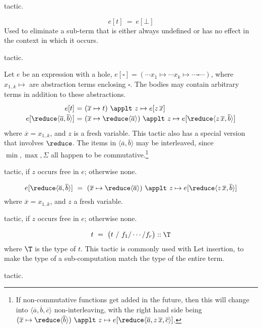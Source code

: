 \Obligations tactic.

\[e[t] ~=~ e[\bot]\]
%
Used to eliminate a sub-term that is either always undefined or has no effect
in the context in which it occurs.

\Obligations tactic.

\vspace{3mm}
Let $e$ be an expression with a hole, $e[\square] = (\cdots x_1 \mapsto \cdots x_k\mapsto \cdots \square \cdots)$, 
where $x_{1..k}\mapsto$ are abstraction terms enclosing $\square$. The bodies may contain arbitrary terms
in addition to these abstractions.
%
\[\renewcommand\arraystretch{1.2}
  \begin{array}{@{}r@{}c@{}l@{}}
  e[t] & ~=~ & (\overline{x}\mapsto t) ~\applt~ z\mapsto e[z\,\overline{x}] \\
  e[\reduce \langle\overline{a},\overline{b}\rangle] & ~=~ &
     (\overline{x}\mapsto \reduce\langle\overline{a}\rangle) ~\applt~ z\mapsto e[\reduce\langle z\,\overline{x}, \overline{b}\rangle]
  \end{array}\]
%
where $\overline{x}=x_{1..k}$, and $z$ is a fresh variable.
This tactic also has a special version that involves $\reduce$.
The items in $\langle \overline{a},\overline{b}\rangle$ may be interleaved, since
$\min,\max,\Sigma$ all happen to be commutative.\footnote{If non-commutative functions get added in the future, then this will change into $\langle \overline{a}, \overline{b}, \overline{c}\rangle$ non-interleaving, with the right hand side being $(\overline{x}\mapsto \reduce\langle\overline{b}\rangle) ~\applt~ z\mapsto e[\reduce\langle \overline{a}, z\,\overline{x}, \overline{c}\rangle]$.}

\Obligations tactic, if $z$ occurs free in $e$; otherwise none.

%
\[e[\reduce \langle\overline{a},\overline{b}\rangle] ~=~ 
  (\overline{x}\mapsto \reduce\langle\overline{a}\rangle) ~\applt~ z\mapsto e[\reduce\langle z\,\overline{x}, \overline{b}\rangle]\]
%
where $\overline{x}=x_{1..k}$, and $z$ a fresh variable.

\Obligations tactic, if $z$ occurs free in $e$; otherwise none.

\[t ~=~ \big(t~/~f_1/\cdots/f_r\big) :: \T\]
%
where $\T$ is the type of $t$. This tactic is commonly used with Let insertion,
to make the type of a sub-computation match the type of the entire term.

\Obligations tactic.

